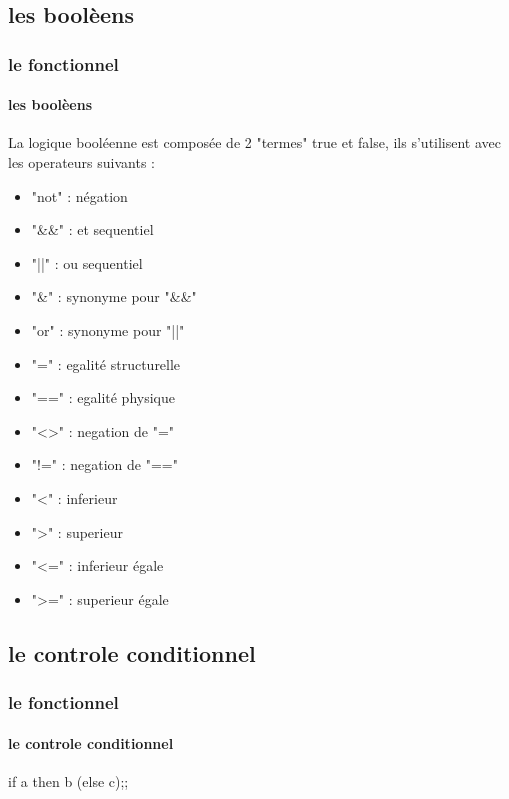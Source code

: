   \subsection{les boolèens}
\begin{frame}
    \frametitle{le fonctionnel}
    \framesubtitle{les boolèens}
      La logique booléenne est composée de 2 "termes" true et false, ils s'utilisent avec les operateurs suivants :
      \begin{center}
      \begin{minipage}[t]{7cm}
	  \begin{itemize}
	    \item "not" : négation
	    \item "\&\&" : et sequentiel
	    \item "||" : ou sequentiel
	    \item "\&" : synonyme pour "\&\&"
	    \item "or" : synonyme pour "||"
	  \end{itemize}
	\end{minipage}
      \end{center}
	\begin{minipage}[t]{5cm}
	  \begin{itemize}
	    \item "=" : egalité structurelle
	    \item "==" : egalité physique
	    \item "<>" : negation de "="
	    \item "!=" : negation de "=="
	  \end{itemize}
	\end{minipage}
	\begin{minipage}[t]{5cm}
	  \begin{itemize}
	    \item "<" : inferieur 
	    \item ">" : superieur
	    \item "<=" : inferieur égale
	    \item ">=" : superieur égale
	  \end{itemize}
	\end{minipage}
\end{frame}
    \subsection{le controle conditionnel}
\begin{frame}
      \frametitle{le fonctionnel}
      \framesubtitle{le controle conditionnel}
      \begin{center}
	if a then b (else c);;
  \end{center}
\end{frame}
